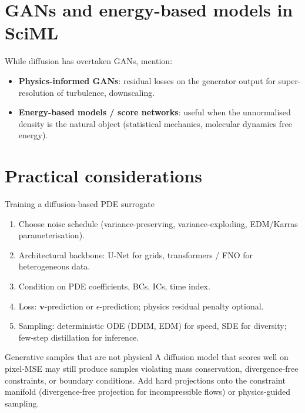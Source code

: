 \section{GANs and energy-based models in SciML}
While diffusion has overtaken GANs, mention:
\begin{itemize}
\item \textbf{Physics-informed GANs}: residual losses on the generator
output for super-resolution of turbulence, downscaling.
\item \textbf{Energy-based models / score networks}: useful when the
unnormalised density is the natural object (statistical mechanics,
molecular dynamics free energy).
\end{itemize}

\section{Practical considerations}
\begin{recipe}{Training a diffusion-based PDE surrogate}
\begin{enumerate}
\item Choose noise schedule (variance-preserving, variance-exploding,
EDM/Karras parameterisation).
\item Architectural backbone: U-Net for grids, transformers / FNO for
heterogeneous data.
\item Condition on PDE coefficients, BCs, ICs, time index.
\item Loss: $\bm{v}$-prediction or $\epsilon$-prediction; physics
residual penalty optional.
\item Sampling: deterministic ODE (DDIM, EDM) for speed, SDE for
diversity; few-step distillation for inference.
\end{enumerate}
\end{recipe}

\begin{pitfall}{Generative samples that are not physical}
A diffusion model that scores well on pixel-MSE may still produce
samples violating mass conservation, divergence-free constraints, or
boundary conditions. Add hard projections onto the constraint manifold
(divergence-free projection for incompressible flows) or physics-guided
sampling.
\end{pitfall}
